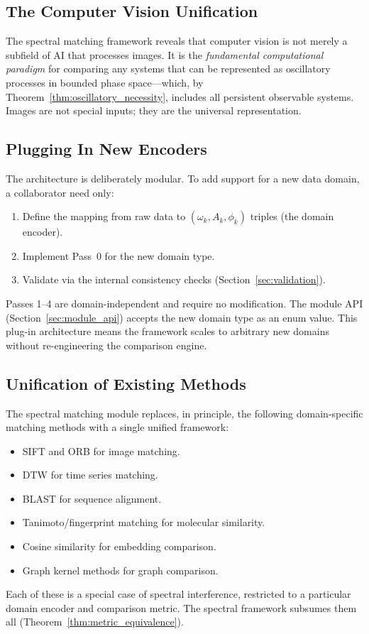 \documentclass[11pt,twocolumn,a4paper]{article}
\begin{document}
\subsection{The Computer Vision Unification}

The spectral matching framework reveals that computer vision is not
merely a subfield of AI that processes images. It is the
\emph{fundamental computational paradigm} for comparing any systems that
can be represented as oscillatory processes in bounded phase space---which,
by Theorem~\ref{thm:oscillatory_necessity}, includes all persistent
observable systems. Images are not special inputs; they are the universal
representation.

\subsection{Plugging In New Encoders}

The architecture is deliberately modular. To add support for a new data
domain, a collaborator need only:
\begin{enumerate}[nosep]
  \item Define the mapping from raw data to $(\omega_k, A_k, \phi_k)$
    triples (the domain encoder).
  \item Implement Pass~0 for the new domain type.
  \item Validate via the internal consistency checks
    (Section~\ref{sec:validation}).
\end{enumerate}
Passes 1--4 are domain-independent and require no modification. The
module API (Section~\ref{sec:module_api}) accepts the new domain type as
an enum value. This plug-in architecture means the framework scales to
arbitrary new domains without re-engineering the comparison engine.

\subsection{Unification of Existing Methods}

The spectral matching module replaces, in principle, the following
domain-specific matching methods with a single unified framework:
\begin{itemize}[nosep]
  \item SIFT \citep{lowe2004} and ORB \citep{rublee2011} for image
    matching.
  \item DTW \citep{sakoe1978} for time series matching.
  \item BLAST \citep{altschul1990} for sequence alignment.
  \item Tanimoto/fingerprint matching \citep{willett1998} for molecular
    similarity.
  \item Cosine similarity for embedding comparison.
  \item Graph kernel methods \citep{xu2019} for graph comparison.
\end{itemize}
Each of these is a special case of spectral interference, restricted to
a particular domain encoder and comparison metric. The spectral framework
subsumes them all (Theorem~\ref{thm:metric_equivalence}).
\end{document}

